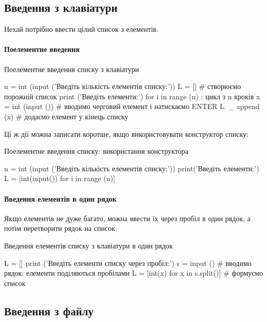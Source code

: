 \subsection{Введення з клавіатури}\label{inkeyb}

Нехай потрібно ввести цілий список з  елементів.

\cleardoublepage

\paragraph{Поелементне введення}\mbox{}

\begin{defn}{Поелементне введення списку з клавіатури}
\begin{py}{}
n = int (input ('Введіть кількість елементів списку:'))
L = [] # створюємо порожній список
print ('Введіть елементи:')
for i in range (n) : цикл з n кроків
    x = int (input ()) # вводимо черговий елемент і натискаємо ENTER
    L. _ append (x) # додаємо елемент у кінець списку
\end{py}
\end{defn}
\noindent Ці ж дії можна записати коротше, якщо використовувати конструктор списку:
\begin{defn}{Поелементне введення списку: використання конструктора}
\begin{py}{}
n = int (input ('Введіть кількість елементів списку:'))
print('Введіть елементи:')
L = [int(input()) for i in range (n)]
\end{py}
\end{defn}

\paragraph{Введення елементів в один рядок}
Якщо елементів не дуже багато, можна ввести їх через пробіл в один рядок, а потім перетворити рядок на список:
\begin{defn}{Введення елементів списку з клавіатури в один рядок}
\begin{py}{}
L = []
print ('Введіть елементи списку через пробіл:')
s = input () # вводимо рядок: елементи поділяються пробілами
L = [int(x) for x in s.split()] # формуємо список
\end{py}
\end{defn}

\subsection{Введення з файлу}\label{infile}


